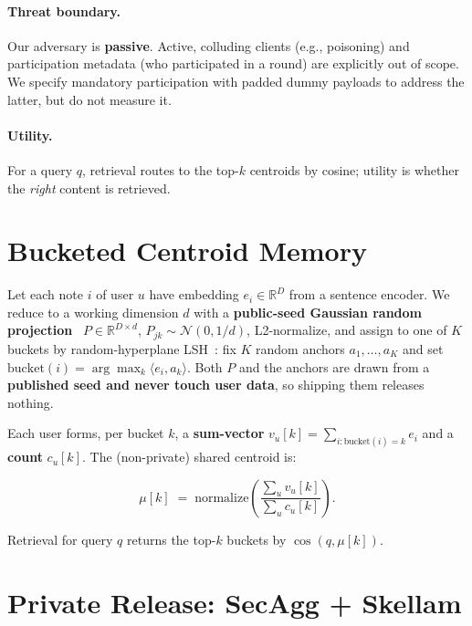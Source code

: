 \documentclass[conference]{IEEEtran}
\theoremstyle{remark}
\newcommand{\R}{\mathbb{R}}
\begin{document}
\paragraph{Threat boundary.} Our adversary is \textbf{passive}. Active, colluding clients (e.g., poisoning) and participation metadata (who participated in a round) are explicitly out of scope. We specify mandatory participation with padded dummy payloads to address the latter, but do not measure it.

\paragraph{Utility.} For a query $q$, retrieval routes to the top-$k$ centroids by cosine; utility is whether the \emph{right} content is retrieved.

\section{Bucketed Centroid Memory}\label{sec:centroid}

Let each note $i$ of user $u$ have embedding $e_i \in \R^{D}$ from a sentence encoder. We reduce to a working dimension $d$ with a \textbf{public-seed Gaussian random projection}~\cite{achlioptas2003rp} $P \in \R^{D \times d}$, $P_{jk} \sim \mathcal{N}(0, 1/d)$, L2-normalize, and assign to one of $K$ buckets by random-hyperplane LSH~\cite{charikar2002simhash}: fix $K$ random anchors $a_1, \dots, a_K$ and set $\mathrm{bucket}(i) = \arg\max_k \langle e_i, a_k \rangle$. Both $P$ and the anchors are drawn from a \textbf{published seed and never touch user data}, so shipping them releases nothing.

Each user forms, per bucket $k$, a \textbf{sum-vector} $v_u[k] = \sum_{i : \mathrm{bucket}(i) = k} e_i$ and a \textbf{count} $c_u[k]$. The (non-private) shared centroid is:

\begin{equation}\label{eq:centroid}
  \mu[k] \;=\; \mathrm{normalize}\!\left(
    \frac{\sum_u v_u[k]}{\sum_u c_u[k]}
  \right).
\end{equation}

Retrieval for query $q$ returns the top-$k$ buckets by $\cos(q, \mu[k])$.

\section{Private Release: SecAgg + Skellam}\label{sec:release}
\end{document}
